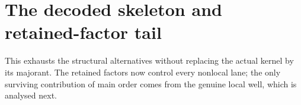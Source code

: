 \section{The decoded skeleton and retained-factor tail}

This exhausts the structural alternatives without replacing the actual kernel by its majorant.  The retained factors now control every nonlocal lane; the only surviving contribution of main order comes from the genuine local well, which is analysed next.
